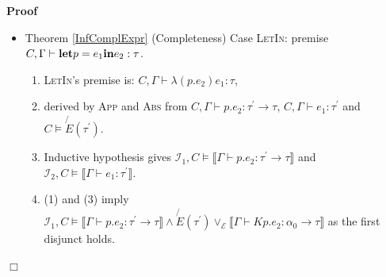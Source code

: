 \documentclass{article}
\newcommand{\assign}{:=}
\newcommand{\tmname}[1]{\textsc{#1}}
\newcommand{\tmstrong}[1]{\textbf{#1}}
\newenvironment{proof}{\noindent\textbf{Proof\ }}{\hspace*{\fill}$\Box$\medskip}
\begin{document}
\begin{proof}
\begin{itemize}
\begin{enumerate}
      \item By induction hypothesis, (2) implies $\mathcal{I}_i, C \wedge
      \alpha \dot{=} \tau^{\prime} \vDash \Phi_i$ for $\Phi_i = \llbracket
      \Gamma \vdash e_i : \tau_i \rrbracket$, $i = 1, 2, \tau_1 \assign
      \tau^{\prime} \rightarrow \tau, \tau_2 \assign \tau^{\prime}$.
      
      \item By (2) and nonemptiness of sorts, we have $C \vDash \exists \alpha
      . (C \wedge \alpha \dot{=} \tau^{\prime})$.
      
      \item By (2), (3), and because $C \vDash D$ implies $\exists \alpha .C
      \vDash \exists \alpha .D$, we have $\mathcal{I}_1 \mathcal{I}_2, \exists
      \alpha . (C \wedge \alpha \dot{=} \tau^{\prime}) \vDash \exists \alpha .
      (\Phi_1 \wedge \Phi_2 \wedge \not{E} (\alpha))$.
      
      \item By (4) and (5), we have the goal $\mathcal{I}, C \vDash \llbracket
      \Gamma \vdash e_1 e_2 : \tau \rrbracket$ with $\mathcal{I}=\mathcal{I}_1
      \mathcal{I}_2$.
    \end{enumerate}
    \item Theorem \ref{InfComplExpr} (Completeness) Case {\tmname{LetIn}}:
    premise $C, \Gamma \vdash \text{{\tmstrong{let}}} p = e_1 
    \text{{\tmstrong{in}}} e_2 : \tau$.
    \begin{enumerate}
      \item {\tmname{LetIn}}'s premise is: $C, \Gamma \vdash \lambda (p.e_2)
      e_1 : \tau$,
      
      \item derived by {\tmname{App}} and {\tmname{Abs}} from $C, \Gamma
      \vdash p.e_2 : \tau^{\prime} \rightarrow \tau$, $C, \Gamma \vdash e_1 :
      \tau^{\prime}$ and $C \vDash \not{E} (\tau^{\prime})$.
      
      \item Inductive hypothesis gives $\mathcal{I}_1, C \vDash \llbracket
      \Gamma \vdash p.e_2 : \tau^{\prime} \rightarrow \tau \rrbracket$ and
      $\mathcal{I}_2, C \vDash \llbracket \Gamma \vdash e_1 : \tau^{\prime}
      \rrbracket$.
      
      \item (1) and (3) imply $\mathcal{I}_1, C \vDash \llbracket \Gamma
      \vdash p.e_2 : \tau^{\prime} \rightarrow \tau \rrbracket \wedge \not{E}
      (\tau^{\prime}) \vee_{\mathcal{E}} \llbracket \Gamma \vdash K p.e_2 :
      \alpha_0 \rightarrow \tau \rrbracket$ as the first disjunct holds.
      

\end{enumerate}
\end{itemize}
\end{proof}
\end{document}
